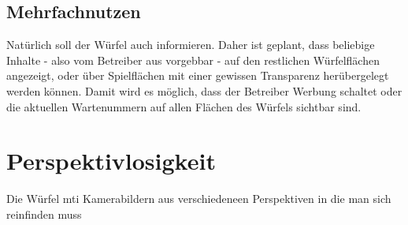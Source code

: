 \documentclass[pdftex,12pt,a4paper]{report}
\begin{document}
\subsection{Mehrfachnutzen}
Natürlich soll der Würfel auch informieren.
Daher ist geplant, dass beliebige Inhalte - also vom Betreiber aus vorgebbar - 
auf den restlichen Würfelflächen angezeigt, oder über Spielflächen mit einer gewissen Transparenz herübergelegt werden können.
Damit wird es möglich, dass der Betreiber Werbung schaltet oder die aktuellen Wartenummern auf allen Flächen des Würfels sichtbar sind.

\section{Perspektivlosigkeit}
Die Würfel mti Kamerabildern aus verschiedeneen Perspektiven in die man sich reinfinden muss 
\end{document}
